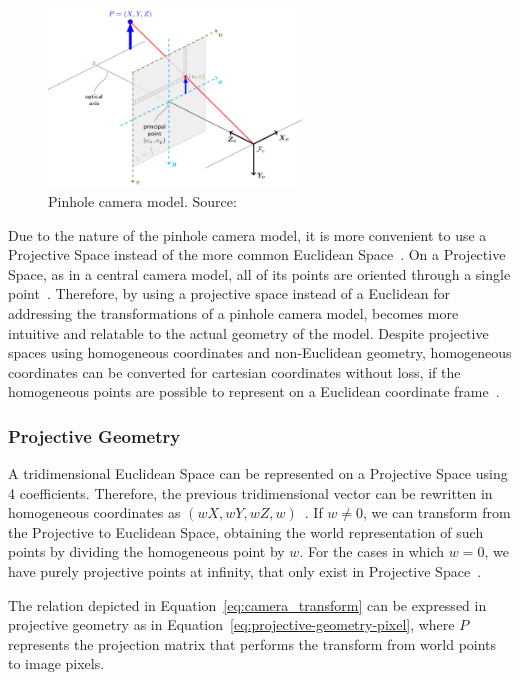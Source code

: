 \begin{figure}[!ht]
	\centering
	\includegraphics[width=0.6\textwidth]{img/camera/pinhole_camera_model.png}
	\caption[Pinhole camera model.]{Pinhole camera model. Source:~\cite{opencv_doc}}
	\label{fig:pinhole_camera_model}
\end{figure}

Due to the nature of the pinhole camera model, it is more convenient to use a Projective Space instead of the more common Euclidean Space~\cite{mvg_book, camera_models, Sturm2010}. On a Projective Space, as in a central camera model, all of its points are oriented through a single point~\cite{mvg_book}. Therefore, by using a projective space instead of a Euclidean for addressing the transformations of a pinhole camera model, becomes more intuitive and relatable to the actual geometry of the model. Despite projective spaces using homogeneous coordinates and non-Euclidean geometry, homogeneous coordinates can be converted for cartesian coordinates without loss, if the homogeneous points are possible to represent on a Euclidean coordinate frame~\cite{mvg_book, camera_models}.

\subsubsection{Projective Geometry}
A tridimensional Euclidean Space can be represented on a Projective Space using 4 coefficients. Therefore, the previous tridimensional vector can be rewritten in homogeneous coordinates as $(wX, wY, wZ, w)$~\cite{mvg_book}. If $w \neq 0$, we can transform from the Projective to Euclidean Space, obtaining the world representation of such points by dividing the homogeneous point by $w$. For the cases in which $w =  0$, we have purely projective points at infinity, that only exist in Projective Space~\cite{mvg_book}. 

The relation depicted in Equation~\eqref{eq:camera_transform} can be expressed in projective geometry as in Equation~\ref{eq:projective-geometry-pixel}, where $P$ represents the projection matrix that performs the transform from world points to image pixels. 

